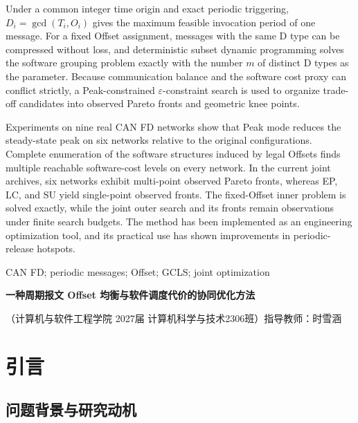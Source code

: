 \documentclass[UTF8,a4paper,twoside,zihao=-4]{ctexart}
\numberwithin{equation}{section}
\numberwithin{figure}{section}
\numberwithin{table}{section}
\newcommand{\fullpapertitle}{一种周期报文 Offset 均衡与软件调度代价的协同优化方法}
\theoremstyle{definition}
\numberwithin{algocf}{section}
\begin{document}
Under a common integer time origin and exact periodic triggering, $D_i=\gcd(T_i,O_i)$ gives the maximum feasible invocation period of one message. For a fixed Offset assignment, messages with the same D type can be compressed without loss, and deterministic subset dynamic programming solves the software grouping problem exactly with the number $m$ of distinct D types as the parameter. Because communication balance and the software cost proxy can conflict strictly, a Peak-constrained $\varepsilon$-constraint search is used to organize trade-off candidates into observed Pareto fronts and geometric knee points.

Experiments on nine real CAN FD networks show that Peak mode reduces the steady-state peak on six networks relative to the original configurations. Complete enumeration of the software structures induced by legal Offsets finds multiple reachable software-cost levels on every network. In the current joint archives, six networks exhibit multi-point observed Pareto fronts, whereas EP, LC, and SU yield single-point observed fronts. The fixed-Offset inner problem is solved exactly, while the joint outer search and its fronts remain observations under finite search budgets. The method has been implemented as an engineering optimization tool, and its practical use has shown improvements in periodic-release hotspots.

\par{} {\rmfamily{}CAN FD; periodic messages; Offset; GCLS; joint optimization}
\endgroup

\clearpage
\tableofcontents
\clearpage
\listoffigures
\clearpage
\listoftables
\clearpage

\setcounter{page}{1}
\thispagestyle{firstbody}
\begin{center}
  {\heiti\bfseries{}\fullpapertitle\par}
  \vspace{0.8\baselineskip}
  {\songti{}（计算机与软件工程学院 2027届 计算机科学与技术2306班）\quad 指导教师：时雪涵\par}
\end{center}
\vspace{0.75\baselineskip}
\section{引言}

\subsection{问题背景与研究动机}
\end{document}
